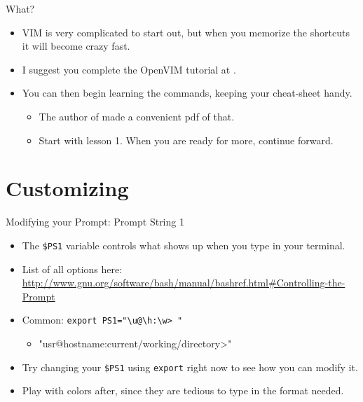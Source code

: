 \documentclass[11pt]{beamer}
\begin{document}
\begin{frame}[fragile]{What?}
  \begin{itemize}[<+- | alert@+>]
    \item VIM is very complicated to start out, but when you memorize the shortcuts it will become crazy fast.
    \item I suggest you complete the OpenVIM tutorial at \cite{vimtutorial}.
    \item You can then begin learning the commands, keeping your cheat-sheet\cite{gvim-cheat} handy.
    \begin{itemize}[<+- | alert@+>]
      \item The author of \cite{single-pdf} made a convenient pdf of that.
      \item Start with lesson 1.  When you are ready for more, continue forward.
    \end{itemize}
  \end{itemize}
\end{frame}

%

%
\section{Customizing}
\label{sec:customizing}

\begin{frame}[fragile]{Modifying your Prompt: Prompt String 1}
  \begin{itemize}[<+- | alert@+>]
    \item The \texttt{\$PS1} variable controls what shows up when you type in your terminal.
    \item List of all options here: {\tiny \href{http://www.gnu.org/software/bash/manual/bashref.html#Controlling-the-Prompt}{http://www.gnu.org/software/bash/manual/bashref.html\#Controlling-the-Prompt}}
    \item Common: \texttt{export PS1="\textbackslash u@\textbackslash h:\textbackslash w> "}
    \begin{itemize}[<+- | alert@+>]
      \item "usr@hostname:current/working/directory>"
    \end{itemize}
    \item Try changing your \texttt{\$PS1} using \texttt{export} right now to see how you can modify it.
    \item Play with colors after, since they are tedious to type in the format needed.
  \end{itemize}
\end{frame}
\end{document}
